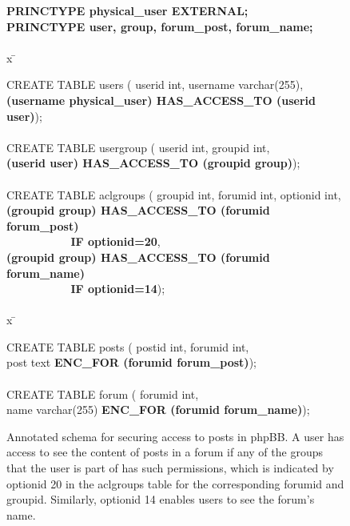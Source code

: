 \renewcommand{\FrameSep}{0.05in}
\begin{figure}[t!]
\begin{framed}
\footnotesize

\begin{tabbing}

{\bf PRINCTYPE physical\_user EXTERNAL;} \\
{\bf PRINCTYPE user, group, forum\_post, forum\_name;}\\

\\

x \= \kill

CREATE TABLE users ( userid int, username varchar(255),\\

\> {\bf (username physical\_user) HAS\_ACCESS\_TO (userid user)});\\

\\

CREATE TABLE usergroup ( userid int, groupid int,\\

\> {\bf (userid user) HAS\_ACCESS\_TO (groupid group)});\\

\\

CREATE TABLE aclgroups ( groupid int, forumid int, optionid int, \\

\> {\bf (groupid group) HAS\_ACCESS\_TO (forumid forum\_post)} \\
\> {\bf ~ ~ ~ ~ ~ ~ IF optionid=20}, \\
\> {\bf (groupid group) HAS\_ACCESS\_TO (forumid forum\_name)} \\
\> {\bf ~ ~ ~ ~ ~ ~ IF optionid=14}); \\

\\
x \= \kill


CREATE TABLE posts ( postid int, forumid int,\\
\> post text {\bf ENC\_FOR (forumid forum\_post)});\\
\\
CREATE TABLE forum ( forumid int,\\
\> name varchar(255) {\bf ENC\_FOR (forumid forum\_name)});

\end{tabbing}
\vspace{-0.15in}

\end{framed}

\caption{Annotated schema for securing access to posts in phpBB\@. A
  user has access to see the content of posts in a forum if any of the
  groups that the user is part of has such permissions, which is indicated
  by optionid 20 in the aclgroups table for the corresponding forumid
  and groupid. Similarly, optionid 14 enables users to see the forum's
  name.}

\label{fig:posts}
\end{figure}

